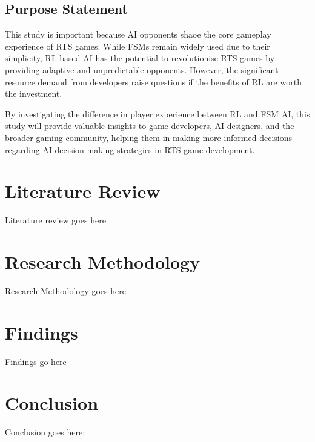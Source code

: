 \documentclass[conference]{IEEEtran}
\begin{document}
\subsection{Purpose Statement}

This study is important because AI opponents shaoe the core gameplay experience of RTS games. While FSMs remain widely used due to their simplicity, RL-based AI has the potential to revolutionise
RTS games by providing adaptive and unpredictable opponents. However, the significant resource demand from developers raise questions if the benefits of RL are worth the investment.

By investigating the difference in player experience between RL and FSM AI, this study will provide valuable insights to game developers, AI designers, and the broader gaming community, helping them
in making more informed decisions regarding AI decision-making strategies in RTS game development.

\section{Literature Review}

Literature review goes here

\section{Research Methodology}

Research Methodology goes here

\section{Findings}

Findings go here

\section{Conclusion}

Conclusion goes here:



\end{document}
